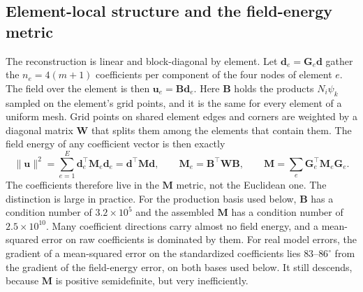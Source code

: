 \documentclass[conf]{new-aiaa}
\newcommand{\dvec}{\mathbf{d}}
\begin{document}
\subsection{Element-local structure and the field-energy metric}
\label{sec:gram}
The reconstruction is linear and block-diagonal by element. Let $\dvec_e=\mathbf{G}_e\dvec$ gather the $n_e=4(m+1)$ coefficients per component of the four nodes of element $e$. The field over the element is then $\mathbf{u}_e=\mathbf{B}\dvec_e$. Here $\mathbf{B}$ holds the products $N_i\psi_k$ sampled on the element's grid points, and it is the same for every element of a uniform mesh. Grid points on shared element edges and corners are weighted by a diagonal matrix $\mathbf{W}$ that splits them among the elements that contain them. The field energy of any coefficient vector is then exactly
\begin{equation}
  \|\mathbf{u}\|^2=\sum_{e=1}^{E}\dvec_e^{\top}\mathbf{M}_e\dvec_e=\dvec^{\top}\mathbf{M}\dvec,\qquad
  \mathbf{M}_e=\mathbf{B}^{\top}\mathbf{W}\mathbf{B},\qquad
  \mathbf{M}=\sum_{e}\mathbf{G}_e^{\top}\mathbf{M}_e\mathbf{G}_e .
  \label{eq:gram}
\end{equation}
The coefficients therefore live in the $\mathbf{M}$ metric, not the Euclidean one. The distinction is large in practice. For the production basis used below, $\mathbf{B}$ has a condition number of $3.2\times10^{5}$ and the assembled $\mathbf{M}$ has a condition number of $2.5\times10^{10}$. Many coefficient directions carry almost no field energy, and a mean-squared error on raw coefficients is dominated by them. For real model errors, the gradient of a mean-squared error on the standardized coefficients lies $83$--$86^\circ$ from the gradient of the field-energy error, on both bases used below. It still descends, because $\mathbf{M}$ is positive semidefinite, but very inefficiently.
\end{document}
